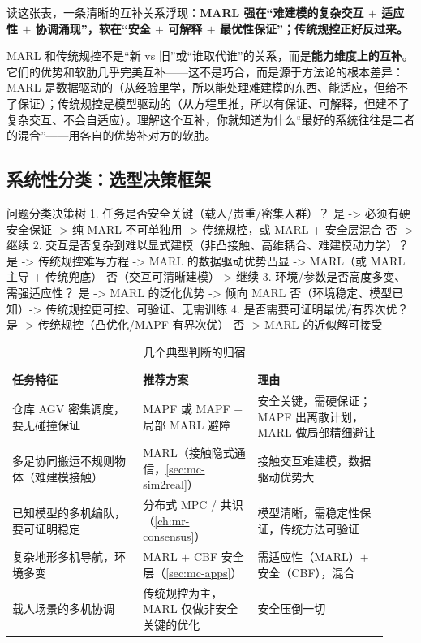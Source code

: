 \noindent 读这张表，一条清晰的互补关系浮现：\textbf{MARL 强在“难建模的复杂交互 $+$ 适应性 $+$ 协调涌现”，软在“安全 $+$ 可解释 $+$ 最优性保证”；传统规控正好反过来。}

\begin{insight}
MARL 和传统规控不是“新 vs 旧”或“谁取代谁”的关系，而是\textbf{能力维度上的互补}。它们的优势和软肋几乎完美互补——这不是巧合，而是源于方法论的根本差异：MARL 是数据驱动的（从经验里学，所以能处理难建模的东西、能适应，但给不了保证）；传统规控是模型驱动的（从方程里推，所以有保证、可解释，但建不了复杂交互、不会自适应）。理解这个互补，你就知道为什么“最好的系统往往是二者的混合”——用各自的优势补对方的软肋。
\end{insight}

\subsection{系统性分类：选型决策框架}
\label{sec:mc-selection}

\begin{codebox}[text]{问题分类决策树}
1. 任务是否安全关键（载人/贵重/密集人群）？
   是 -> 必须有硬安全保证 -> 纯 MARL 不可单独用 -> 传统规控，或 MARL + 安全层混合
   否 -> 继续
2. 交互是否复杂到难以显式建模（非凸接触、高维耦合、难建模动力学）？
   是 -> 传统规控难写方程 -> MARL 的数据驱动优势凸显 -> MARL（或 MARL 主导 + 传统兜底）
   否（交互可清晰建模）-> 继续
3. 环境/参数是否高度多变、需强适应性？
   是 -> MARL 的泛化优势 -> 倾向 MARL
   否（环境稳定、模型已知）-> 传统规控更可控、可验证、无需训练
4. 是否需要可证明最优/有界次优？
   是 -> 传统规控（凸优化/MAPF 有界次优）
   否 -> MARL 的近似解可接受
\end{codebox}

\begin{table}[H]\centering\small
\caption{几个典型判断的归宿}
\label{tab:mc-selection}
\begin{tabular}{p{0.32\linewidth}p{0.28\linewidth}p{0.32\linewidth}}
\toprule
任务特征 & 推荐方案 & 理由 \\
\midrule
仓库 AGV 密集调度，要无碰撞保证 & MAPF 或 MAPF $+$ 局部 MARL 避障 & 安全关键，需硬保证；MAPF 出离散计划，MARL 做局部精细避让 \\
多足协同搬运不规则物体（难建模接触） & MARL（接触隐式通信，\cref{sec:mc-sim2real}） & 接触交互难建模，数据驱动优势大 \\
已知模型的多机编队，要可证明稳定 & 分布式 MPC / 共识（\cref{ch:mr-consensus}） & 模型清晰，需稳定性保证，传统方法可验证 \\
复杂地形多机导航，环境多变 & MARL $+$ CBF 安全层（\cref{sec:mc-apps}） & 需适应性（MARL）$+$ 安全（CBF），混合 \\
载人场景的多机协调 & 传统规控为主，MARL 仅做非安全关键的优化 & 安全压倒一切 \\
\bottomrule
\end{tabular}
\end{table}

